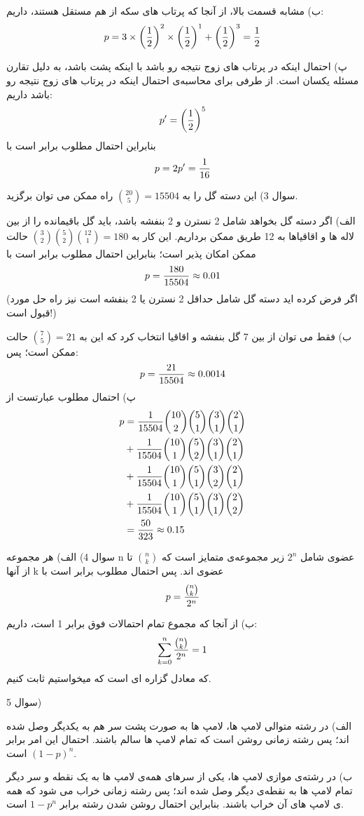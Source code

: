 \documentclass[10pt,letterpaper]{article}
\begin{document}
ب) مشابه قسمت بالا، از آنجا که پرتاب های سکه از هم مستقل هستند، داریم:
$$
p=3\times \left({1\over 2}\right)^2\times \left({1\over 2}\right)^1 +\left({1\over 2}\right)^{3}={1\over2}
$$

پ) احتمال اینکه در پرتاب های زوج نتیجه رو باشد با اینکه پشت باشد، به دلیل تقارن مسئله یکسان است. از طرفی برای محاسبه‌ی احتمال اینکه در پرتاب های زوج نتیجه رو باشد داریم:
$$
p'=\left({1\over 2}\right)^5
$$
بنابراین احتمال مطلوب برابر است با
$$
p=2p'={1\over 16}
$$

سوال 3) این دسته گل را به 
$
\binom{20}{5}=15504
$
راه ممکن می توان برگزید.

الف) اگر دسته گل بخواهد شامل 2 نسترن و 2 بنفشه باشد، باید گل باقیمانده را از بین لاله ها و اقاقیاها به 12 طریق ممکن برداریم. این کار به 
$
\binom{3}{2}\binom{5}{2}\binom{12}{1}=180
$
حالت ممکن امکان پذیر است؛ بنابراین احتمال مطلوب برابر است با
$$
p={180\over 15504}\approx0.01
$$
(اگر فرض کرده اید دسته گل شامل حداقل 2 نسترن یا 2 بنفشه است نیز راه حل مورد قبول است!)

ب) فقط می توان از بین 7 گل بنفشه و اقاقیا انتخاب کرد که این به 
$
\binom{7}{5}=21
$
حالت ممکن است؛ پس:
$$
p={21\over 15504}\approx0.0014
$$
پ) احتمال مطلوب عبارتست از
\[
\begin{split}
p&={1\over 15504}{\binom{10}{2}\binom{5}{1}\binom{3}{1}\binom{2}{1}}
\\&+{1\over 15504}{\binom{10}{1}\binom{5}{2}\binom{3}{1}\binom{2}{1}}
\\&+{1\over 15504}{\binom{10}{1}\binom{5}{1}\binom{3}{2}\binom{2}{1}}
\\&+{1\over 15504}{\binom{10}{1}\binom{5}{1}\binom{3}{1}\binom{2}{2}}
\\&={50\over 323}\approx0.15
\end{split}
\]

سوال 4) الف) هر مجموعه n عضوی شامل $2^n$ زیر مجموعه‌ی متمایز است که 
$
\binom{n}{k}
$
تا از آنها k عضوی اند. پس احتمال مطلوب برابر است با
$$
p={\binom{n}{k}\over 2^n}
$$

ب) از آنجا که مجموع تمام احتمالات فوق برابر 1 است، داریم:
$$
\sum_{k=0}^n{\binom{n}{k}\over 2^n}=1
$$
که معادل گزاره ای است که میخواستیم ثابت کنیم.

سوال 5)

الف) در رشته متوالی لامپ ها، لامپ ها به صورت پشت سر هم به یکدیگر وصل شده اند؛ پس رشته زمانی روشن است که تمام لامپ ها سالم باشند. احتمال این امر برابر 
$
(1-p)^n
$
است.

ب) در رشته‌ی موازی لامپ ها، یکی از سرهای همه‌ی لامپ ها به یک نقطه و سر دیگر تمام لامپ ها به نقطه‌ی دیگر وصل شده اند؛ پس رشته زمانی خراب می شود که همه ی لامپ های آن خراب باشند. بنابراین احتمال روشن شدن رشته برابر 
$
1-p^n
$
است.
\end{document}
